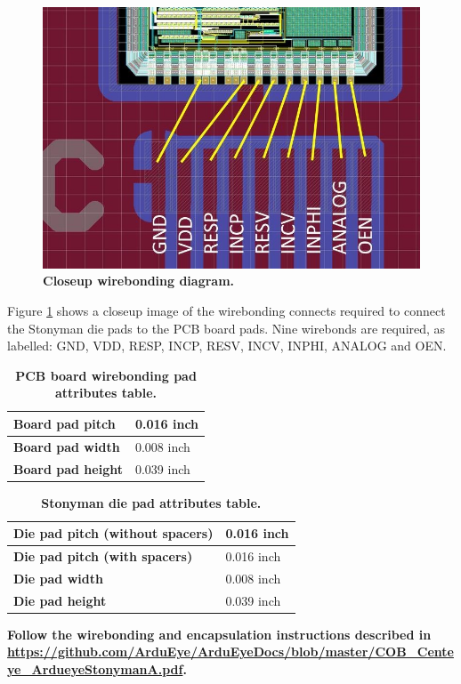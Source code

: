 \documentclass[12pt,letterpaper]{report}
\begin{document}
\begin{figure}[h!]
 \centering
 \includegraphics[width=1.0\textwidth]{centeye/stonyman-wirebonding-closeup.jpg}
 \caption[b]{\textbf{Closeup wirebonding diagram.}}
 \label{fig-wirebonding-closeup}
\end{figure}

\noindent
Figure \ref{fig-wirebonding-closeup} shows a closeup image of the wirebonding
connects required to connect the Stonyman die pads to the PCB board pads.  Nine
wirebonds are required, as labelled: GND, VDD, RESP, INCP, RESV, INCV, INPHI,
ANALOG and OEN.

\begin{table}[!ht]
   \centering
   \begin{tabular}{|l|l|}
      \hline
      \textbf{Board pad pitch} & 0.016 inch \\
      \hline
      \textbf{Board pad width} & 0.008 inch \\
      \hline
      \textbf{Board pad height} & 0.039 inch \\
      \hline
   \end{tabular}
   \caption{\textbf{PCB board wirebonding pad attributes table.}}
   \label{table-pads-board}
\end{table}

\begin{table}[!ht]
   \centering
   \begin{tabular}{|l|l|}
      \hline
      \textbf{Die pad pitch (without spacers)} & 0.016 inch \\
      \hline
      \textbf{Die pad pitch (with spacers)} & 0.016 inch \\
      \hline
      \textbf{Die pad width} & 0.008 inch \\
      \hline
      \textbf{Die pad height} & 0.039 inch \\
      \hline
   \end{tabular}
   \caption{\textbf{Stonyman die pad attributes table.}}
   \label{table-pads-die}
\end{table}

\noindent
\bf Follow the wirebonding and encapsulation instructions described in
\url{https://github.com/ArduEye/ArduEyeDocs/blob/master/COB_Centeye_ArdueyeStonymanA.pdf}.
\end{document}
